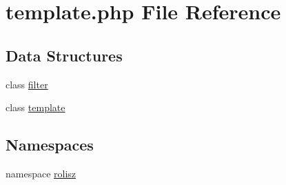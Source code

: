 \hypertarget{template_8php}{
\section{template.php File Reference}
\label{template_8php}
}
\subsection*{Data Structures}
\begin{DoxyCompactItemize}
\item 
class \hyperlink{classfilter}{filter}
\item 
class \hyperlink{classtemplate}{template}
\end{DoxyCompactItemize}
\subsection*{Namespaces}
\begin{DoxyCompactItemize}
\item 
namespace \hyperlink{namespacerolisz}{rolisz}
\end{DoxyCompactItemize}
